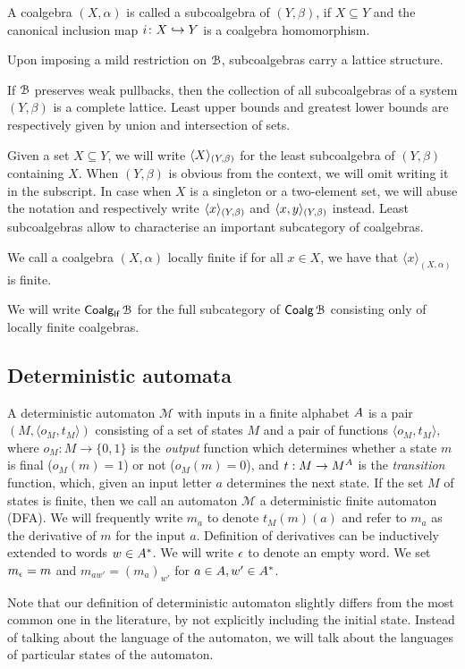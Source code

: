 \begin{definition}\label{c2:def:subcoalgebra}
A coalgebra $(X, \alpha)$ is called a subcoalgebra of $(Y, \beta)$, if $X \subseteq Y$ and the canonical inclusion map $i \colon X \hookrightarrow Y$ is a coalgebra homomorphism.	
\end{definition}
Upon imposing a mild restriction on $\mathcal{B}$, subcoalgebras carry a lattice structure.
\begin{lemma}\label{c2:lem:subcoalgebras_lattice}
If $\mathcal{B}$ preserves weak pullbacks, then the collection of all subcoalgebras of a system $(Y, \beta)$ is a complete lattice. Least upper bounds and greatest lower bounds are respectively given by union and intersection of sets. 
\end{lemma}
Given a set $X \subseteq Y$, we will write $\langle X \rangle_{(Y, \beta)}$ for the least subcoalgebra of $(Y, \beta)$ containing $X$.	 When $(Y, \beta)$ is obvious from the context, we will omit writing it in the subscript.
In case when $X$ is a singleton or a two-element set, we will abuse the notation and respectively write $\langle x \rangle_{(Y, \beta)}$ and $\langle x,y \rangle_{(Y, \beta)}$ instead. Least subcoalgebras allow to characterise an important subcategory of coalgebras.
\begin{definition}\label{c2:def:locally_finite}
We call a coalgebra $(X, \alpha)$ locally finite if for all $x \in X$, we have that $\langle x \rangle_{(X, \alpha)}$ is finite.		
\end{definition}
We will write $\mathop{\mathsf{Coalg}_{\mathsf{lf}}}{\mathcal{B}}$ for the full subcategory of $\mathop{\mathsf{Coalg}}{\mathcal{B}}$ consisting only of locally finite coalgebras.
\subsection{Deterministic automata}\label{c2:subsec:deterministic_automata}
A deterministic automaton $\mathcal{M}$ with inputs in a finite alphabet ${A}$ is a pair $(M, \langle o_M , t_M \rangle)$ consisting of a set of states $M$ and a pair of functions $\langle o_M, t_M \rangle$, where $o_M \colon M \to \{0,1\}$ is the \emph{output} function which determines whether a state $m$ is final ($o_M(m)=1$) or not ($o_M(m)=0$), and $t :M \to M^{A}$ is the \emph{transition} function, which, given an input letter $a$ determines the next state. If the set $M$ of states is finite, then we call an automaton $\mathcal{M}$ a deterministic finite automaton (DFA). We will frequently write $m_a$ to denote $t_M(m)(a)$ and refer to $m_a$ as the derivative of $m$ for the input $a$. Definition of derivatives can be inductively extended to words $w \in {A}^{\ast}$. We will write $\epsilon$ to denote an empty word. We set $m_{\epsilon} = m$ and $m_{aw'} = (m_a)_{w'}$ for $a \in {A}, w' \in {A}^\ast$.
\begin{remark}\label{c2:rem:automata_as_coalgebras}
Note that our definition of deterministic automaton slightly differs from the most common one in the literature, by not explicitly including the initial state. Instead of talking about the language of the automaton, we will talk about the languages of particular states of the automaton. 	
\end{remark}


